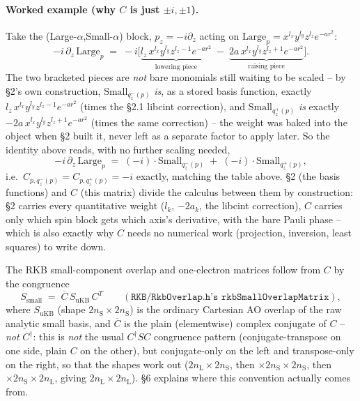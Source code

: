 \documentclass[11pt]{article}
\begin{document}
\paragraph{Worked example (why $C$ is just $\pm i,\pm1$).} Take the (Large-$\alpha$,Small-$\alpha$)
block, $p_z=-i\partial_z$ acting on $\text{Large}_p = x^{l_x}y^{l_y}z^{l_z}e^{-ar^2}$:
\begin{equation}
-i\,\partial_z\,\text{Large}_p
\;=\; -i\Big[\underbrace{l_z\,x^{l_x}y^{l_y}z^{l_z-1}e^{-ar^2}}_{\text{lowering piece}}
\;-\; \underbrace{2a\,x^{l_x}y^{l_y}z^{l_z+1}e^{-ar^2}}_{\text{raising piece}}\Big].
\end{equation}
The two bracketed pieces are \emph{not} bare monomials still waiting to be scaled -- by \S2's own
construction, $\text{Small}_{q^{-}_z(p)}$ \emph{is}, as a stored basis function, exactly
$l_z\,x^{l_x}y^{l_y}z^{l_z-1}e^{-ar^2}$ (times the \S2.1 libcint correction), and
$\text{Small}_{q^{+}_z(p)}$ \emph{is} exactly $-2a\,x^{l_x}y^{l_y}z^{l_z+1}e^{-ar^2}$ (times the same
correction) -- the weight was baked into the object when \S2 built it, never left as a separate
factor to apply later. So the identity above reads, with no further scaling needed,
\begin{equation}
-i\,\partial_z\,\text{Large}_p \;=\; (-i)\cdot\text{Small}_{q^{-}_z(p)} \;+\; (-i)\cdot\text{Small}_{q^{+}_z(p)},
\end{equation}
i.e.\ $C_{p,q^{-}_z(p)}=C_{p,q^{+}_z(p)}=-i$ exactly, matching the table above. \S2 (the basis
functions) and $C$ (this matrix) divide the calculus between them by construction: \S2 carries every
quantitative weight ($l_k$, $-2a_k$, the libcint correction), $C$ carries only which spin block gets
which axis's derivative, with the bare Pauli phase -- which is also exactly why $C$ needs no
numerical work (projection, inversion, least squares) to write down.

The RKB small-component overlap and one-electron matrices follow from $C$
by the congruence
\begin{equation}
S_{\text{small}} \;=\; \overline{C}\,S_{\text{uKB}}\,C^{T}
\qquad(\texttt{RKB/RkbOverlap.h's rkbSmallOverlapMatrix}),
\end{equation}
where $S_{\text{uKB}}$ (shape $2n_{\text{S}}\times2n_{\text{S}}$) is the ordinary Cartesian AO
overlap of the raw analytic small basis, and $\overline{C}$ is the plain (elementwise) complex
conjugate of $C$ -- \emph{not} $C^{\dagger}$: this is \emph{not} the usual $C^{\dagger}SC$
congruence pattern (conjugate-transpose on one side, plain $C$ on the other), but conjugate-only on
the left and transpose-only on the right, so that the shapes work out
($2n_{\text{L}}\times2n_{\text{S}}$, then $\times2n_{\text{S}}\times2n_{\text{S}}$, then
$\times2n_{\text{S}}\times2n_{\text{L}}$, giving $2n_{\text{L}}\times2n_{\text{L}}$). \S6 explains
where this convention actually comes from.
\end{document}
